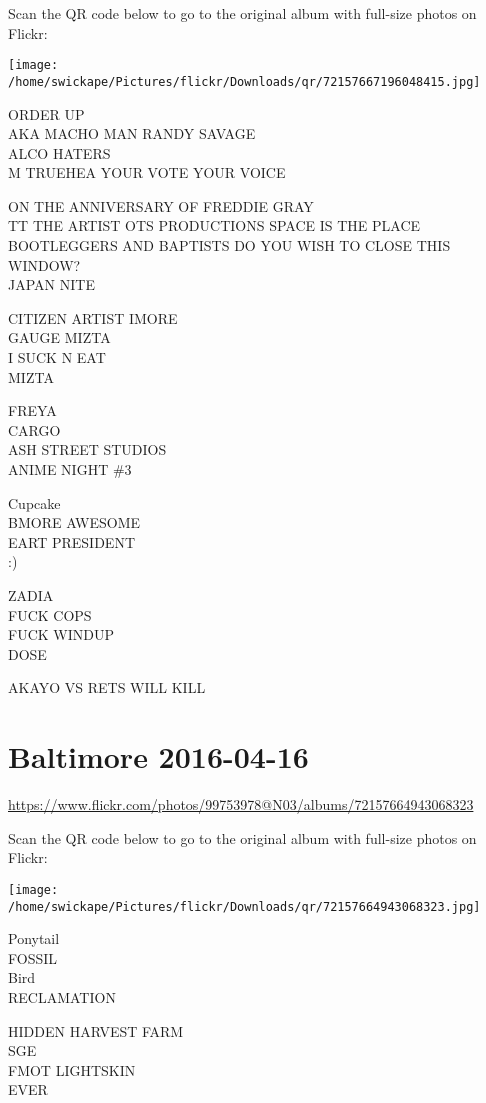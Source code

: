 \documentclass[10pt,letterpaper]{article}
\begin{document}
Scan the QR code below to go to the original album with full-size photos on Flickr:

\texttt{[image: /home/swickape/Pictures/flickr/Downloads/qr/72157667196048415.jpg]}


ORDER UP\\
AKA MACHO MAN RANDY SAVAGE\\
ALCO HATERS\\
M TRUEHEA YOUR VOTE YOUR VOICE

ON THE ANNIVERSARY OF FREDDIE GRAY\\
TT THE ARTIST OTS PRODUCTIONS SPACE IS THE PLACE\\
BOOTLEGGERS AND BAPTISTS DO YOU WISH TO CLOSE THIS WINDOW?\\
JAPAN NITE

CITIZEN ARTIST IMORE\\
GAUGE MIZTA\\
I SUCK N EAT\\
MIZTA

FREYA\\
CARGO\\
ASH STREET STUDIOS\\
ANIME NIGHT \#3

Cupcake\\
BMORE AWESOME\\
EART PRESIDENT\\
:)

ZADIA\\
FUCK COPS\\
FUCK WINDUP\\
DOSE

AKAYO VS RETS WILL KILL


\section*{Baltimore 2016-04-16}

\url{https://www.flickr.com/photos/99753978@N03/albums/72157664943068323}

Scan the QR code below to go to the original album with full-size photos on Flickr:

\texttt{[image: /home/swickape/Pictures/flickr/Downloads/qr/72157664943068323.jpg]}


Ponytail\\
FOSSIL\\
Bird\\
RECLAMATION

HIDDEN HARVEST FARM\\
SGE\\
FMOT LIGHTSKIN\\
EVER
\end{document}
